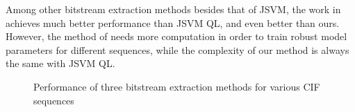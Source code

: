 \documentclass[journal]{IEEEtran}
\begin{document}
Among other bitstream extraction methods besides that of JSVM, the work in \cite{Maani09} achieves much better performance than JSVM QL, and even better than ours. However, the method of \cite{Maani09} needs more computation in order to train robust model parameters for different sequences, while the complexity of our method is always the same with JSVM QL.

\begin{figure}[t]
\centering
{}
\qquad
{}
\caption{Performance of three bitstream extraction methods for various CIF sequences}
\label{fig:performance}
\end{figure}
\end{document}
